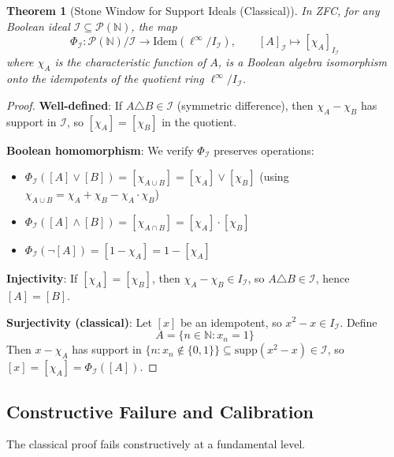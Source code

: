 \documentclass[11pt]{article}
\newtheorem{theorem}{Theorem}[section]
\newcommand{\N}{\mathbb{N}}
\newcommand{\linf}{\ell^\infty}
\newcommand{\supp}{\mathrm{supp}}
\newcommand{\Idem}{\mathrm{Idem}}
\begin{document}
\begin{theorem}[Stone Window for Support Ideals (Classical)]\label{thm:stone-general-classical}
In ZFC, for any Boolean ideal $\mathcal{I} \subseteq \mathcal{P}(\N)$, the map
\[
\Phi_{\mathcal{I}}: \mathcal{P}(\N)/\mathcal{I} \longrightarrow \Idem(\linf/I_{\mathcal{I}}), \qquad [A]_{\mathcal{I}} \mapsto [\chi_A]_{I_{\mathcal{I}}}
\]
where $\chi_A$ is the characteristic function of $A$, is a Boolean algebra isomorphism onto the idempotents of the quotient ring $\linf/I_{\mathcal{I}}$.
\end{theorem}
\begin{proof}
\textbf{Well-defined}: If $A \triangle B \in \mathcal{I}$ (symmetric difference), then $\chi_A - \chi_B$ has support in $\mathcal{I}$, so $[\chi_A] = [\chi_B]$ in the quotient.

\textbf{Boolean homomorphism}: We verify $\Phi_{\mathcal{I}}$ preserves operations:
\begin{itemize}
\item $\Phi_{\mathcal{I}}([A] \vee [B]) = [\chi_{A \cup B}] = [\chi_A] \vee [\chi_B]$ (using $\chi_{A \cup B} = \chi_A + \chi_B - \chi_A \cdot \chi_B$)
\item $\Phi_{\mathcal{I}}([A] \wedge [B]) = [\chi_{A \cap B}] = [\chi_A] \cdot [\chi_B]$
\item $\Phi_{\mathcal{I}}(\neg[A]) = [1 - \chi_A] = 1 - [\chi_A]$
\end{itemize}

\textbf{Injectivity}: If $[\chi_A] = [\chi_B]$, then $\chi_A - \chi_B \in I_{\mathcal{I}}$, so $A \triangle B \in \mathcal{I}$, hence $[A] = [B]$.

\textbf{Surjectivity (classical)}: Let $[x]$ be an idempotent, so $x^2 - x \in I_{\mathcal{I}}$. Define
\[
A = \{n \in \N : x_n = 1\}
\]
Then $x - \chi_A$ has support in $\{n : x_n \notin \{0,1\}\} \subseteq \supp(x^2 - x) \in \mathcal{I}$, so $[x] = [\chi_A] = \Phi_{\mathcal{I}}([A])$.
\end{proof}

\subsection{Constructive Failure and Calibration}

The classical proof fails constructively at a fundamental level.
\end{document}
